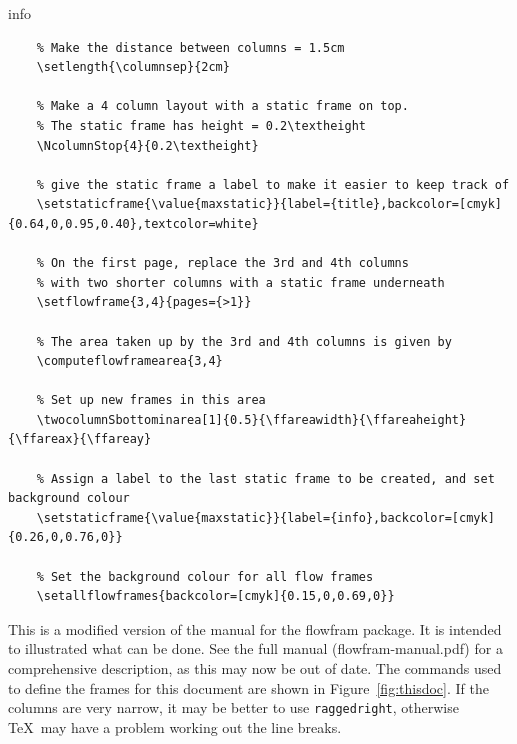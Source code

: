 \documentclass[a0]{a0poster}
\newcommand{\sty}[1]{\textsf{#1}}
\newcommand{\cmdname}[1]{\texttt{\symbol{92}#1}}
\begin{document}

\pagestyle{empty}

\begin{staticcontents*}{info}
\begin{staticfigure}

\begin{verbatim}
    % Make the distance between columns = 1.5cm
    \setlength{\columnsep}{2cm}

    % Make a 4 column layout with a static frame on top.
    % The static frame has height = 0.2\textheight
    \NcolumnStop{4}{0.2\textheight}

    % give the static frame a label to make it easier to keep track of
    \setstaticframe{\value{maxstatic}}{label={title},backcolor=[cmyk]{0.64,0,0.95,0.40},textcolor=white}

    % On the first page, replace the 3rd and 4th columns
    % with two shorter columns with a static frame underneath
    \setflowframe{3,4}{pages={>1}}

    % The area taken up by the 3rd and 4th columns is given by
    \computeflowframearea{3,4}
    
    % Set up new frames in this area
    \twocolumnSbottominarea[1]{0.5}{\ffareawidth}{\ffareaheight}{\ffareax}{\ffareay}

    % Assign a label to the last static frame to be created, and set background colour
    \setstaticframe{\value{maxstatic}}{label={info},backcolor=[cmyk]{0.26,0,0.76,0}}

    % Set the background colour for all flow frames
    \setallflowframes{backcolor=[cmyk]{0.15,0,0.69,0}}
\end{verbatim}

\caption{The commands used to define the frames for this document}
\protect\label{fig:thisdoc}
\end{staticfigure}
\end{staticcontents*}

This is a modified version of the manual for the \sty{flowfram} 
package.  It is intended to illustrated what can be done. See the 
full manual (flowfram-manual.pdf) for
a comprehensive description, as this may now be out of date. The commands used to define the frames for
this document are shown in Figure~\ref{fig:thisdoc}.
If the columns are very narrow, it may be better to
use \cmdname{raggedright}, otherwise \TeX\ may have a
problem working out the line breaks.
\end{document}
